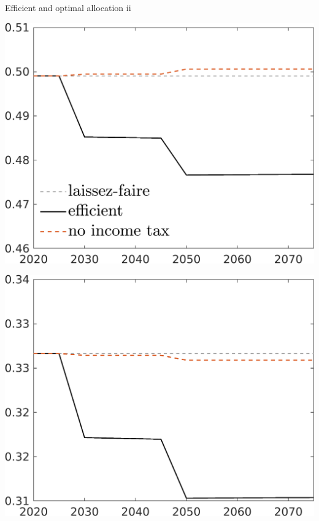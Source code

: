 \documentclass[11pt,aspectratio=169]{beamer}
\begin{document}
\addtocounter{framenumber}{-1}
\begin{frame}{Efficient and optimal allocation ii }
	\centering
	\begin{minipage}[]{0.3\textwidth}
		\includegraphics[width=1\textwidth]{../codding_model/own_basedOnFried/optimalPol_elastS_DisuSci/figures/all_1705/hh_CompEffOPT_T_NoTaus_noopt_spillover0_noskill0_sep1_BN0_ineq0_red0_xgrowth0_zero0_countec0_etaa0.79_lgd1_lff1.png}
	\end{minipage}
	\begin{minipage}[]{0.3\textwidth}
		\includegraphics[width=1\textwidth]{../codding_model/own_basedOnFried/optimalPol_elastS_DisuSci/figures/all_1705/hl_CompEffOPT_T_NoTaus_noopt_spillover0_noskill0_sep1_BN0_ineq0_red0_xgrowth0_zero0_countec0_etaa0.79_lgd0_lff1.png}

\end{minipage}
\end{frame}
\end{document}
